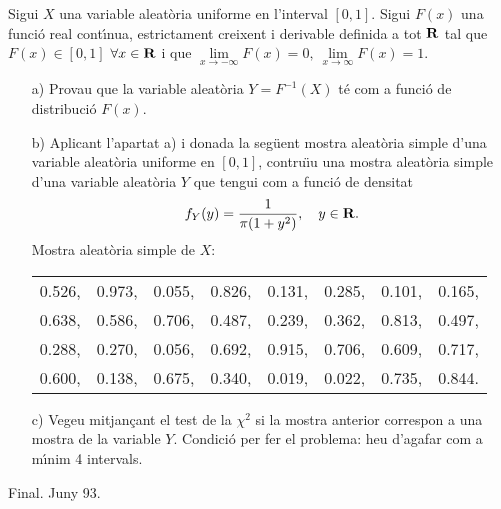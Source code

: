 \begin{probres}
{Sigui $X$ una variable aleat\`oria
 uniforme en l'interval $[0,1]$. 
Sigui $F(x)$ una
funci\'o real cont\'{\i}nua, 
estrictament creixent i 
derivable definida a tot ${\bf R}$
tal que $F(x)\in [0,1]$ $\forall x\in{\bf R}$ i que $\lim\limits_{x\to -\infty} 
F(x)=0,\ \lim\limits_{x\to\infty} F(x)=1$.
\begin{itemize}
\item[a)]{Provau que la variable aleat\`oria $Y=F^{-1}(X)$ t\'e com a funci\'o 
de distribuci\'o
$F(x)$.}
\item[b)]{Aplicant l'apartat a) i donada la seg\"uent mostra aleat\`oria simple d'una variable aleat\`oria uniforme
en $[0,1]$, contru\"{\i}u una mostra aleat\`oria simple d'una variable aleat\`oria $Y$ que tengui com a funci\'o de
densitat $$f_Y(y)={1\over \pi (1+y^2)},\quad y\in{\bf R} .$$}
Mostra aleat\`oria simple de $X$:
\begin{center}
\begin{tabular}{cccccccc}
0.526,&0.973,&0.055,&0.826,&0.131,&0.285,&0.101,&0.165,\\
0.638,&0.586,&0.706,&0.487,&0.239,&0.362,&0.813,&0.497,\\
0.288,&0.270,&0.056,&0.692,&0.915,&0.706,&0.609,&0.717,\\
0.600,&0.138,&0.675,&0.340,&0.019,&0.022,&0.735,&0.844.\\
\end{tabular}
\end{center}
\item[c)]{Vegeu mitjan\c{c}ant el test de la $\chi^2$ si la
mostra anterior correspon a una mostra de la variable $Y$.\newline
{\footnotesize
Condici\'o per fer el problema: heu d'agafar com a m\'{\i}nim 4
intervals.}}
\end{itemize}
{\footnotesize Final. Juny 93.}
}
\end{probres} 

